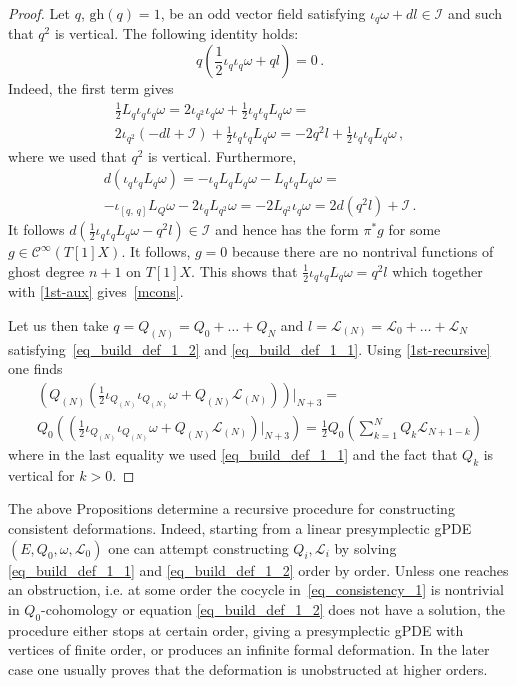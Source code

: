 \documentclass[a4paper,12pt]{article}
\numberwithin{equation}{section} %
\newcommand{\gh}[1]{\mathrm{gh}(#1)}
\newcommand{\commut}[2]{[#1{,}\,#2]}
\newcommand{\hhalf}{\frac{1}{2}}
\newcommand{\cC}{\mathcal{C}}
\def\cI{\mathcal{I}}
\def\cL{\mathcal{L}}
\newcommand{\h}{\cL}
\begin{document}
\begin{proof}
Let $q$, $\gh{q}=1$, be an odd vector field satisfying $\iota_q \omega+d l\in\cI$ and such that $q^2$ is vertical. The following identity holds:
\begin{equation}
\label{mcons}
q(\hhalf \iota_q\iota_q\omega+ql)=0\,.
\end{equation}
Indeed, the first term gives
\begin{multline}
\label{1st-aux}
\hhalf L_q \iota_q\iota_q \omega=2\iota_{q^2}\iota_q\omega+\hhalf \iota_q\iota_q  L_q  \omega= \\
2\iota_{q^2}(-dl+\cI)+\hhalf \iota_q\iota_q  L_q  \omega= -2q^2l +\hhalf \iota_q\iota_q  L_q  \omega\,,
\end{multline}
where we used that $q^2$ is vertical. Furthermore,
\begin{multline}
d(\iota_q\iota_qL_q\omega)=
-\iota_qL_qL_q\omega-L_q\iota_qL_q\omega=
\\
-\iota_{\commut{q}{q}}L_Q\omega-2\iota_qL_{q^2}\omega=-2 L_{q^2}\iota_q \omega =
2d (q^2 l)+\cI \,.
\end{multline}
It follows $d(\hhalf \iota_q\iota_qL_q\omega-q^2l)\in \cI$ and hence has the form $\pi^*g$ for some $g\in \cC^\infty(T[1]X)$. It follows, $g=0$ because  there are no nontrival functions of ghost degree $n+1$ on $T[1]X$. This shows that $\hhalf \iota_q\iota_qL_q\omega=q^2l$ which together with \eqref{1st-aux} gives~\eqref{mcons}.


Let us then take $q=Q_{(N)}=Q_0+\ldots+Q_N$ and
$l=\cL_{(N)}=\cL_0+\ldots+\cL_N$ satisfying~\eqref{eq_build_def_1_2} and \eqref{eq_build_def_1_1}. Using \eqref{1st-recursive} one finds
\begin{multline}
\left(Q_{(N)}\left(\frac{1}{2}\iota_{Q_{(N)}}\iota_{Q_{(N)}} \omega +Q_{(N)}\cL_{(N)}\right)\right)\Big|_{N+3}=\\
Q_0\left(\left(\frac{1}{2}\iota_{Q_{(N)}}\iota_{Q_{(N)}} \omega+Q_{(N)}\cL_{(N)}\right)\Big|_{N+3}\right)=
\hhalf Q_0 \left( \sum_{k=1}^{N} Q_k \h_{N+1-k} \right)
\end{multline}
where in the last equality we used \eqref{eq_build_def_1_1} and the fact that $Q_k$ is vertical for $k>0$.
\end{proof}

	
The above Propositions determine a recursive procedure for constructing consistent deformations.  Indeed, starting from a linear presymplectic gPDE $(E,Q_0,\omega,\h_0)$ one can attempt constructing   $Q_i,\cL_i$ by solving \eqref{eq_build_def_1_1} and \eqref{eq_build_def_1_2} order by order. Unless one reaches an obstruction, i.e. at some order the cocycle in~\eqref{eq_consistency_1} is nontrivial in $Q_0$-cohomology or equation \eqref{eq_build_def_1_2} does not have a solution, the procedure either stops at certain order, giving a presymplectic gPDE with vertices of finite order, or produces an infinite formal deformation. In the later case one usually proves that the deformation is unobstructed at higher orders.
\end{document}
